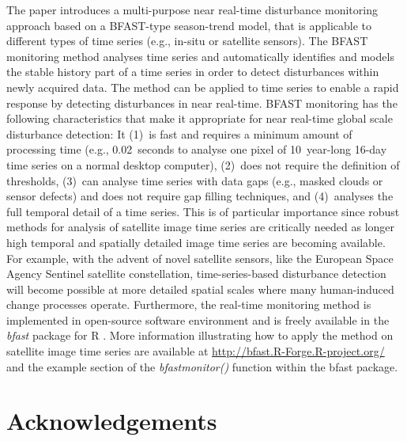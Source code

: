 \documentclass[authoryear,preprint,review,10pt]{elsarticle}
\begin{document}
The paper introduces a multi-purpose near real-time disturbance monitoring approach based on a BFAST-type season-trend model, that is applicable to different types of time series (e.g., in-situ or satellite sensors). The BFAST monitoring method analyses time series and automatically identifies and models the stable history part of a time series in order to detect disturbances within newly acquired data. The method can be applied to time series to enable a rapid
response by detecting disturbances in near real-time. BFAST monitoring has the following characteristics that make it appropriate for near real-time global scale disturbance detection: It (1)~is fast and requires a minimum amount of processing time (e.g., 0.02~seconds to analyse one pixel of 10~year-long 16-day time series on a normal desktop computer), (2)~does not require the definition of thresholds, (3)~can analyse time series with data gaps (e.g., masked clouds or sensor defects) and does not require gap filling techniques, and (4)~analyses the full temporal detail of a time series. This is of particular importance since robust methods for analysis of satellite image time series are critically needed as longer high temporal and spatially detailed image time series are becoming available. For example, with the advent of novel satellite sensors, like the European Space Agency Sentinel satellite constellation, time-series-based disturbance detection will become possible at more detailed spatial scales where many human-induced change processes operate. Furthermore, the real-time monitoring method is implemented in open-source software environment and is freely available in the \emph{bfast} package for {R} \citep{R}. More information illustrating how to apply the method on satellite image time series are available at \url{http://bfast.R-Forge.R-project.org/} and the example section of the \emph{bfastmonitor()} function within the {bfast} package.


\section{Acknowledgements}
\end{document}
